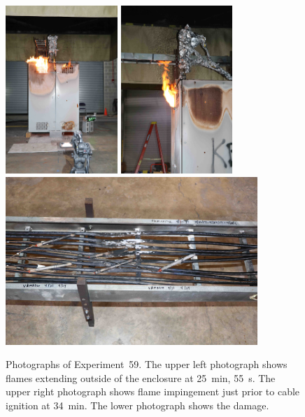 \begin{figure}[p]
\centering
\includegraphics[height=2.50in,angle=-90]{../FIGURES/Test_59_25_min_55_s} \hspace{0.1in}
\includegraphics[height=2.50in,angle=-90]{../FIGURES/Test_59_side} \\ \vspace{0.1in}
\includegraphics[height=2.50in]{../FIGURES/Test_59_scar}
\caption[Photographs of Experiment~59]{Photographs of Experiment~59. The upper left photograph shows flames extending outside of the enclosure at 25~min, 55~s. The upper right photograph shows flame impingement just prior to cable ignition at 34~min. The lower photograph shows the damage.}
\label{fig:Test_59_photos}
\end{figure}


